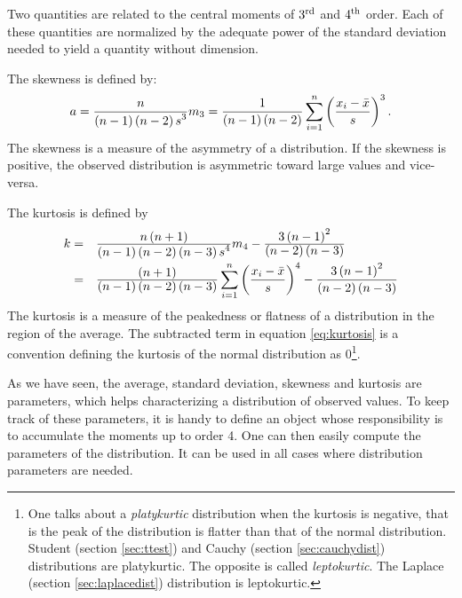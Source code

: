 \documentclass[twoside]{book}
\begin{document}
Two quantities are related to the central moments of $3^{\mathop{\rm rd}}$
and $4^{\mathop{\rm th}}$ order. Each of these quantities are normalized by the
adequate power of the standard deviation needed to yield a
quantity without dimension.

\noindent The skewness is defined by:
\begin{equation}
  a={\displaystyle n \over\displaystyle
  \left(n-1\right)\left(n-2\right)s^3}m_3
  ={\displaystyle 1 \over\displaystyle
  \left(n-1\right)\left(n-2\right)}
  \sum_{i=1}^n\left({\displaystyle x_i-\bar{x}\over\displaystyle s}\right)^3.
\end{equation}
The skewness is a measure of the asymmetry of a distribution. If
the skewness is positive, the observed distribution is asymmetric
toward large values and vice-versa.

\noindent The kurtosis is defined by
\begin{equation}
\label{eq:kurtosis}
  \begin{array}{rl}
    k=& {\displaystyle n\left(n+1\right) \over\displaystyle
  \left(n-1\right)\left(n-2\right)\left(n-3\right)s^4}m_4 -{\displaystyle 3\left(n-1\right)^2 \over\displaystyle
  \left(n-2\right)\left(n-3\right)}\\*[2ex]
    =& {\displaystyle \left(n+1\right) \over\displaystyle
  \left(n-1\right)\left(n-2\right)\left(n-3\right)}
  \displaystyle\sum_{i=1}^n\left({\displaystyle x_i-\bar{x}\over\displaystyle s}\right)^4 -{\displaystyle 3\left(n-1\right)^2 \over\displaystyle
  \left(n-2\right)\left(n-3\right)}
  \end{array}
\end{equation}
The kurtosis is a measure of the peakedness or flatness of a
distribution in the region of the average. The subtracted term in
equation \ref{eq:kurtosis} is a convention defining the kurtosis
of the normal distribution as 0\footnote{One talks about a {\sl
platykurtic} distribution when the kurtosis is negative, that is
the peak of the distribution is flatter than that of the normal
distribution. Student (\cf section \ref{sec:ttest}) and Cauchy
(\cf section \ref{sec:cauchydist}) distributions are platykurtic.
The opposite is called {\sl leptokurtic}. The Laplace (\cf section
\ref{sec:laplacedist}) distribution is leptokurtic. }.

As we have seen, the average, standard deviation, skewness and
kurtosis are parameters, which helps characterizing a distribution
of observed values. To keep track of these parameters, it is handy
to define an object whose responsibility is to accumulate the
moments up to order 4. One can then easily compute the parameters
of the distribution. It can be used in all cases where
distribution parameters are needed.
\end{document}
